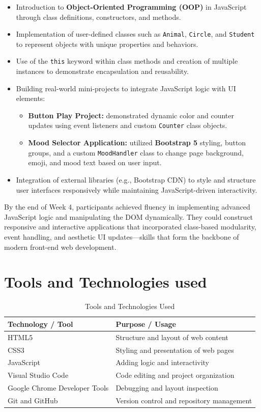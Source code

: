 \documentclass[a4paper,12pt,oneside]{report}
\numberwithin{equation}{chapter}
\numberwithin{figure}{chapter}
\numberwithin{table}{chapter}
\begin{document}
\begin{itemize}
    \item Introduction to \textbf{Object-Oriented Programming (OOP)} in JavaScript through class definitions, constructors, and methods.
    \item Implementation of user-defined classes such as \texttt{Animal}, \texttt{Circle}, and \texttt{Student} to represent objects with unique properties and behaviors.
    \item Use of the \texttt{this} keyword within class methods and creation of multiple instances to demonstrate encapsulation and reusability.
    \item Building real-world mini-projects to integrate JavaScript logic with UI elements:
    \begin{itemize}
        \item \textbf{Button Play Project:} demonstrated dynamic color and counter updates using event listeners and custom \texttt{Counter} class objects.
        \item \textbf{Mood Selector Application:} utilized \textbf{Bootstrap 5} styling, button groups, and a custom \texttt{MoodHandler} class to change page background, emoji, and mood text based on user input.
    \end{itemize}
    \item Integration of external libraries (e.g., Bootstrap CDN) to style and structure user interfaces responsively while maintaining JavaScript-driven interactivity.
\end{itemize}

By the end of Week 4, participants achieved fluency in implementing advanced JavaScript logic and manipulating the DOM dynamically. They could construct responsive and interactive applications that incorporated class-based modularity, event handling, and aesthetic UI updates—skills that form the backbone of modern front-end web development.

\vspace{5mm}
\noindent
\section{Tools and Technologies used}

\begin{table}[H]
\centering
\caption{Tools and Technologies Used}
\begin{tabular}{|p{5cm}|p{8cm}|}
\hline
\textbf{Technology / Tool} & \textbf{Purpose / Usage} \\ \hline
HTML5 & Structure and layout of web content \\ \hline
CSS3 & Styling and presentation of web pages \\ \hline
JavaScript & Adding logic and interactivity \\ \hline
Visual Studio Code & Code editing and project organization \\ \hline
Google Chrome Developer Tools & Debugging and layout inspection \\ \hline
Git and GitHub & Version control and repository management \\ \hline
\end{tabular}
\end{table}
\end{document}
